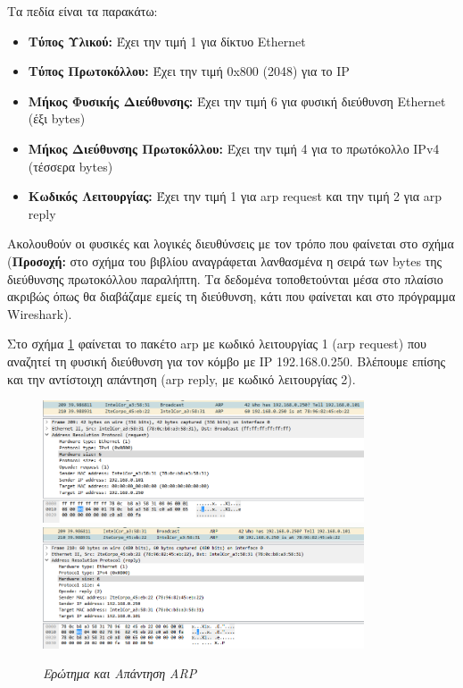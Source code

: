Τα πεδία είναι τα παρακάτω:

\begin{itemize}
\item \textbf{Τύπος Υλικού:} Έχει την τιμή 1 για δίκτυο Ethernet
\item \textbf{Τύπος Πρωτοκόλλου:} Έχει την τιμή 0x800 (2048) για το IP
\item \textbf{Μήκος Φυσικής Διεύθυνσης:} Έχει την τιμή 6 για φυσική διεύθυνση Ethernet (έξι bytes)
\item \textbf{Μήκος Διεύθυνσης Πρωτοκόλλου:} Έχει την τιμή 4 για το πρωτόκολλο IPv4 (τέσσερα bytes)
\item \textbf{Κωδικός Λειτουργίας:} Έχει την τιμή 1 για arp request και την τιμή 2 για arp reply
\end{itemize}

Ακολουθούν οι φυσικές και λογικές διευθύνσεις με τον τρόπο που φαίνεται στο σχήμα (\textbf{Προσοχή:} στο σχήμα του βιβλίου αναγράφεται λανθασμένα η σειρά των bytes της διεύθυνσης πρωτοκόλλου παραλήπτη. Τα δεδομένα τοποθετούνται μέσα στο πλαίσιο ακριβώς όπως θα διαβάζαμε εμείς τη διεύθυνση, κάτι που φαίνεται και στο πρόγραμμα Wireshark).

Στο σχήμα \ref{3-12} φαίνεται το πακέτο arp με κωδικό λειτουργίας 1 (arp request) που αναζητεί τη φυσική διεύθυνση για τον κόμβο με IP 192.168.0.250. Bλέπουμε επίσης και την αντίστοιχη απάντηση (arp reply, με κωδικό λειτουργίας 2).

\begin{figure}[!ht]
 \centering
 \includegraphics[width=0.85\textwidth]{images/chapter3/3-12}
 \includegraphics[width=0.85\textwidth]{images/chapter3/3-13}
 \caption {\textsl{Ερώτημα και Απάντηση ARP}}
 \label{3-12}
\end{figure}


